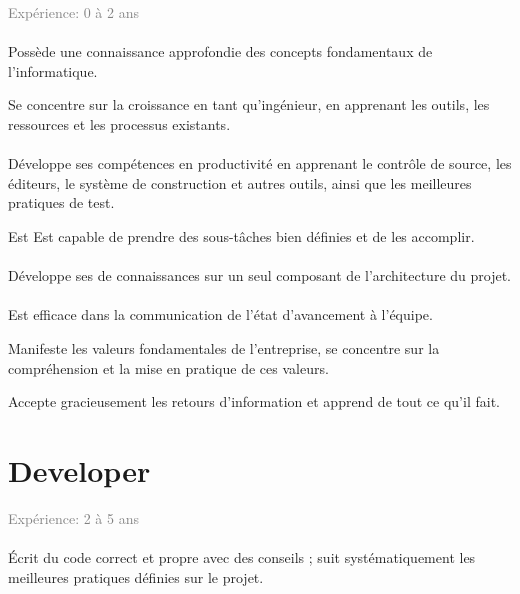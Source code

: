 \documentclass[a4paper, french, openany, 12pt]{book}
\newcommand\dex{\textcolor{BrickRed}{\textbf{\bsc{Dex}}}}
\newcommand\str{\textcolor{DarkOrchid}{\textbf{\bsc{Str}}}}
\newcommand\wis{\textcolor{MidnightBlue}{\textbf{\bsc{Wis}}}}
\newcommand\cha{\textcolor{RawSienna}{\textbf{\bsc{Cha}}}}
\newcommand\xp[1]{\textcolor{Gray}{Expérience: {#1} ans}}
\begin{document}
\xp{0 à 2}

\subsubsection*{\dex} 

Possède une connaissance approfondie des concepts fondamentaux de l'informatique.

Se concentre sur la croissance en tant qu'ingénieur, en apprenant les outils, les ressources et les processus existants.

\subsubsection*{\str}

Développe ses compétences en productivité en apprenant le contrôle de source, les éditeurs, le système de construction 
et autres outils, ainsi que les meilleures pratiques de test.

Est Est capable de prendre des sous-tâches bien définies et de les accomplir.

\subsubsection*{\wis}

Développe ses de connaissances sur un seul composant de l'architecture du projet.

\subsubsection*{\cha}

Est efficace dans la communication de l'état d'avancement à l'équipe.

Manifeste les valeurs fondamentales de l'entreprise, se concentre sur la compréhension et la mise en pratique de ces 
valeurs.

Accepte gracieusement les retours d'information et apprend de tout ce qu'il fait.

\chapter{Developer}

\xp{2 à 5}

\subsubsection*{\dex}

Écrit du code correct et propre avec des conseils ; suit systématiquement les meilleures pratiques définies sur le
projet.
\end{document}
